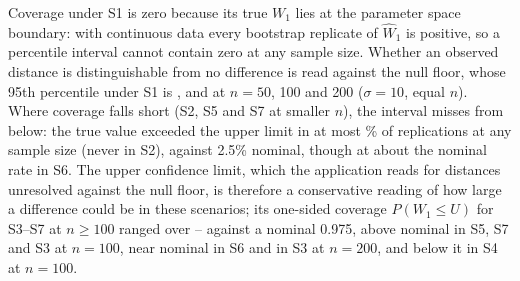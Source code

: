 \documentclass[AMA,Times1COL]{WileyNJDv5}
\begin{document}
Coverage under S1 is zero because its true $W_1$ lies at the parameter space boundary: with continuous data every bootstrap replicate of $\widehat{W}_1$ is positive, so a percentile interval cannot contain zero at any sample size. Whether an observed distance is distinguishable from no difference is read against the null floor, whose 95th percentile under S1 is ,  and  at $n = 50$, 100 and 200 ($\sigma = 10$, equal $n$). Where coverage falls short (S2, S5 and S7 at smaller $n$), the interval misses from below: the true value exceeded the upper limit in at most \% of replications at any sample size (never in S2), against 2.5\% nominal, though at about the nominal rate in S6. The upper confidence limit, which the application reads for distances unresolved against the null floor, is therefore a conservative reading of how large a difference could be in these scenarios; its one-sided coverage $P(W_1 \leq U)$ for S3--S7 at $n \geq 100$ ranged over -- against a nominal 0.975, above nominal in S5, S7 and S3 at $n = 100$, near nominal in S6 and in S3 at $n = 200$, and below it in S4 at $n = 100$.
\end{document}
